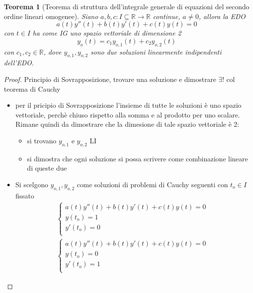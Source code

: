 \documentclass[12pt, a4paper]{article}
\theoremstyle{break}
\newtheorem{theorem}{Teorema} %
\begin{document}
\newpage
\begin{theorem} [Teorema di struttura dell’integrale generale di equazioni del
		secondo ordine lineari omogenee]
	Siano $a, b, c: I \subseteq \mathbb{R} \to \mathbb{R}$ continue, $a
		\neq 0$, allora la EDO
	\[
		a(t) y''(t) + b(t) y'(t) + c(t) y(t) = 0
	\]
	con $t \in I $ ha come IG uno spazio vettoriale di dimensione 2
	\[
		y_o(t) = c_1 y_{o,1}(t) + c_2 y_{o,2}(t)
	\]
	con $c_1, c_2 \in \mathbb{R}$, dove $y_{o,1}, y_{o,2}$ sono due soluzioni
	linearmente indipendenti dell'EDO.
\end{theorem}
\begin{proof} Principio di Sovrapposizione, trovare una soluzione e dimostrare
	$\exists !$ col teorema di Cauchy
	\begin{itemize}
		\item per il pricipio di Sovrapposizione l'insieme di tutte le soluzioni
		      è uno spazio vettoriale, perchè chiuso rispetto alla somma e al
		      prodotto per uno scalare. Rimane quindi da dimostrare che la
		      dimesione di tale spazio vettoriale è 2:
		      \begin{itemize}
			      \item si trovano $y_{o,1}$ e $y_{o,2}$ LI
			      \item si dimostra che ogni soluzione si possa scrivere come
			            combinazione lineare di queste due
		      \end{itemize}
		\item Si scelgono $y_{o,1}, y_{o,2}$ come soluzioni di problemi di
		      Cauchy seguenti con $t_o \in I$ fissato
		      \begin{align*}
			      \begin{cases}
				      a(t) y''(t) + b(t) y'(t) + c(t) y(t) = 0 \\
				      y(t_o) = 1                               \\
				      y'(t_o) = 0                              \\
			      \end{cases}
		      \end{align*}
		      \begin{align*}
			      \begin{cases}
				      a(t) y''(t) + b(t) y'(t) + c(t) y(t) = 0 \\
				      y(t_o) = 0                               \\
				      y'(t_o) = 1                              \\
			      \end{cases}

\end{align*}
\end{itemize}
\end{proof}
\end{document}
